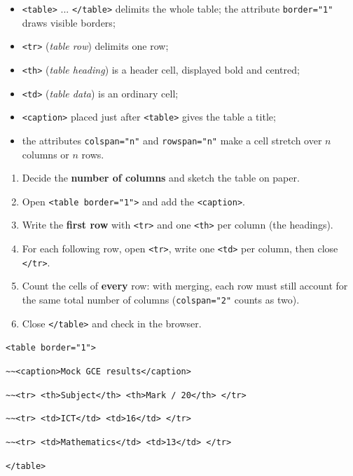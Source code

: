 \documentclass[11pt]{article}
\begin{document}
\begin{definition}
\begin{itemize}
\item \texttt{<table>} ... \texttt{</table>} delimits the whole table; the attribute \texttt{border="1"} draws visible borders;
\item \texttt{<tr>} (\emph{table row}) delimits one row;
\item \texttt{<th>} (\emph{table heading}) is a header cell, displayed bold and centred;
\item \texttt{<td>} (\emph{table data}) is an ordinary cell;
\item \texttt{<caption>} placed just after \texttt{<table>} gives the table a title;
\item the attributes \texttt{colspan="n"} and \texttt{rowspan="n"} make a cell stretch over $n$ columns or $n$ rows.
\end{itemize}
\end{definition}

\begin{methode}
\begin{enumerate}
\item Decide the \textbf{number of columns} and sketch the table on paper.
\item Open \texttt{<table border="1">} and add the \texttt{<caption>}.
\item Write the \textbf{first row} with \texttt{<tr>} and one \texttt{<th>} per column (the headings).
\item For each following row, open \texttt{<tr>}, write one \texttt{<td>} per column, then close \texttt{</tr>}.
\item Count the cells of \textbf{every} row: with merging, each row must still account for the same total number of columns (\texttt{colspan="2"} counts as two).
\item Close \texttt{</table>} and check in the browser.
\end{enumerate}
\end{methode}

\begin{exemplebox}
\texttt{<table border="1">}\par
\texttt{\textasciitilde{}\textasciitilde{}<caption>Mock GCE results</caption>}\par
\texttt{\textasciitilde{}\textasciitilde{}<tr> <th>Subject</th> <th>Mark / 20</th> </tr>}\par
\texttt{\textasciitilde{}\textasciitilde{}<tr> <td>ICT</td> <td>16</td> </tr>}\par
\texttt{\textasciitilde{}\textasciitilde{}<tr> <td>Mathematics</td> <td>13</td> </tr>}\par
\texttt{</table>}
\end{exemplebox}
\end{document}

